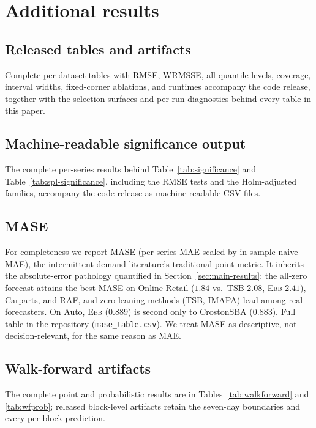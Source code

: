\documentclass[twoside]{article}
\theoremstyle{definition}
\newcommand{\EBB}{\textsc{Ebb}}
\begin{document}


\section{Additional results}\label{app:extra}



\subsection{Released tables and artifacts}
Complete per-dataset tables with RMSE, WRMSSE, all quantile levels,
coverage, interval widths, fixed-corner ablations, and runtimes accompany
the code release, together with the selection surfaces and per-run
diagnostics behind every table in this paper.

\subsection{Machine-readable significance output}
The complete per-series results behind Table~\ref{tab:significance} and
Table~\ref{tab:spl-significance}, including the RMSE tests and the
Holm-adjusted families, accompany the code release as machine-readable
CSV files.

\subsection{MASE}
For completeness we report MASE (per-series MAE scaled by in-sample
naive MAE), the intermittent-demand literature's traditional point
metric. It inherits the absolute-error pathology quantified in
Section~\ref{sec:main-results}: the all-zero forecast attains the best
MASE on Online Retail ($1.84$ vs.\ TSB $2.08$, \EBB{} $2.41$),
Carparts, and RAF, and zero-leaning methods (TSB, IMAPA) lead among real
forecasters. On Auto, \EBB{} ($0.889$) is second only to CrostonSBA
($0.883$). Full table in the repository
(\texttt{mase\_table.csv}). We treat MASE as descriptive, not
decision-relevant, for the same reason as MAE.

\subsection{Walk-forward artifacts}
The complete point and probabilistic results are in
Tables~\ref{tab:walkforward} and \ref{tab:wfprob}; released block-level
artifacts retain the seven-day boundaries and every per-block prediction.
\end{document}
